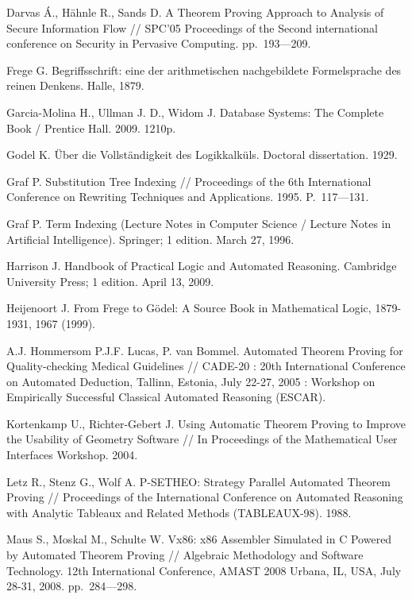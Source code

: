 \begin{thebibliography}{99}
 Darvas Á., Hähnle R., Sands D. A Theorem Proving Approach to Analysis of Secure Information Flow // SPC'05 Proceedings of the Second international conference on Security in Pervasive Computing. pp.~193---209.

 Frege G. Begriffsschrift: eine der arithmetischen nachgebildete Formelsprache des reinen Denkens. Halle, 1879.

 Garcia-Molina H., Ullman J. D., Widom J. Database Systems: The Complete Book / Prentice Hall. 2009. 1210p.

 Godel K. Über die Vollständigkeit des Logikkalküls. Doctoral dissertation. 1929.

 Graf P. Substitution Tree Indexing // Proceedings of the 6th International Conference on Rewriting Techniques and Applications. 1995. P.~117---131.

 Graf P. Term Indexing (Lecture Notes in Computer Science / Lecture Notes in Artificial Intelligence). Springer; 1 edition. March 27, 1996.

 Harrison J. Handbook of Practical Logic and Automated Reasoning. Cambridge University Press; 1 edition. April 13, 2009.


 Heijenoort J. From Frege to Gödel: A Source Book in Mathematical Logic, 1879-1931, 1967 (1999).

 A.J. Hommersom P.J.F. Lucas, P. van Bommel. Automated Theorem Proving for Quality-checking Medical Guidelines // CADE-20 : 20th International Conference on Automated Deduction, Tallinn, Estonia, July 22-27, 2005 : Workshop on Empirically Successful Classical Automated Reasoning (ESCAR).


 Kortenkamp U., Richter-Gebert J. Using Automatic Theorem Proving to Improve the Usability of Geometry Software // In Proceedings of the Mathematical User Interfaces Workshop. 2004. 


  Letz R., Stenz G., Wolf A. P-SETHEO: Strategy Parallel Automated Theorem Proving // Proceedings of the International Conference on Automated Reasoning with Analytic Tableaux and Related Methods (TABLEAUX-98). 1988.

 Maus S., Moskal M., Schulte W. Vx86: x86 Assembler Simulated in C Powered by Automated Theorem Proving // Algebraic Methodology and Software Technology. 12th International Conference, AMAST 2008 Urbana, IL, USA, July 28-31, 2008. pp.~284---298.


\end{thebibliography}
